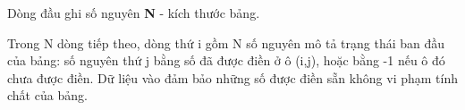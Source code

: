 Dòng đầu ghi số nguyên \textbf{N} - kích thước bảng.

Trong N dòng tiếp theo, dòng thứ i gồm N số nguyên mô tả trạng thái ban đầu của bảng: số nguyên thứ j bằng số đã được điền ở ô (i,j), hoặc bằng -1 nếu ô đó chưa được điền. Dữ liệu vào đảm bảo những số được điền sẵn không vi phạm tính chất của bảng.